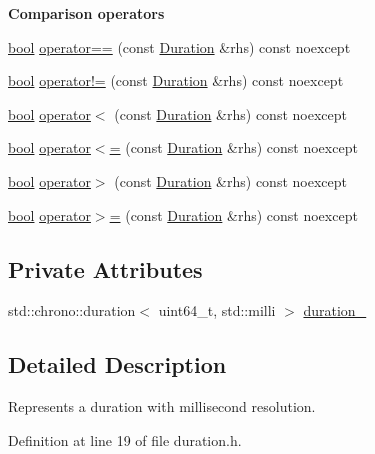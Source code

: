 \begin{Indent}\textbf{ Comparison operators}\par
\begin{DoxyCompactItemize}
\item 
\hyperlink{classbool}{bool} \hyperlink{classfranka_1_1Duration_add0c7bcdfe51b563016236b223d74eae}{operator==} (const \hyperlink{classfranka_1_1Duration}{Duration} \&rhs) const noexcept
\item 
\hyperlink{classbool}{bool} \hyperlink{classfranka_1_1Duration_a61603353e39361af2f405c1df7097e84}{operator!=} (const \hyperlink{classfranka_1_1Duration}{Duration} \&rhs) const noexcept
\item 
\hyperlink{classbool}{bool} \hyperlink{classfranka_1_1Duration_af1650b31c1226a447406fc243f4a2ac1}{operator$<$} (const \hyperlink{classfranka_1_1Duration}{Duration} \&rhs) const noexcept
\item 
\hyperlink{classbool}{bool} \hyperlink{classfranka_1_1Duration_ae4b9c8646fd50a2105d36f3848a5b949}{operator$<$=} (const \hyperlink{classfranka_1_1Duration}{Duration} \&rhs) const noexcept
\item 
\hyperlink{classbool}{bool} \hyperlink{classfranka_1_1Duration_a1702ec9121fe6cff1de533d116edcce0}{operator$>$} (const \hyperlink{classfranka_1_1Duration}{Duration} \&rhs) const noexcept
\item 
\hyperlink{classbool}{bool} \hyperlink{classfranka_1_1Duration_a5bc498cf96d96f5908d6bd93eea491aa}{operator$>$=} (const \hyperlink{classfranka_1_1Duration}{Duration} \&rhs) const noexcept
\end{DoxyCompactItemize}
\end{Indent}
\subsection*{Private Attributes}
\begin{DoxyCompactItemize}
\item 
std\+::chrono\+::duration$<$ uint64\+\_\+t, std\+::milli $>$ \hyperlink{classfranka_1_1Duration_ae446c403b200f0dbf92fb51ca21e82ff}{duration\+\_\+}
\end{DoxyCompactItemize}


\subsection{Detailed Description}
Represents a duration with millisecond resolution. 

Definition at line 19 of file duration.\+h.



